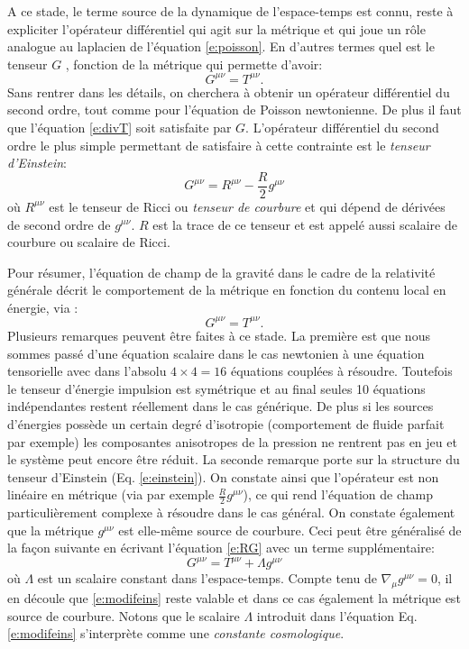 A ce stade, le terme source de la dynamique de l'espace-temps est connu, reste à expliciter l'opérateur différentiel qui agit sur la métrique et qui joue un rôle analogue au laplacien de l'équation \ref{e:poisson}. En d'autres termes quel est le tenseur $G$ , fonction de la métrique qui permette d'avoir:
\begin{equation}
G^{\mu\nu}=T^{\mu\nu}.
\end{equation}
Sans rentrer dans les détails, on cherchera à obtenir un opérateur différentiel du second ordre, tout comme pour l'équation de Poisson newtonienne. De plus il faut que l'équation \ref{e:divT} soit satisfaite par $G$. L'opérateur différentiel du second ordre le plus simple permettant de satisfaire à cette contrainte est le \textit{tenseur d'Einstein}:
\begin{equation}
G^{\mu\nu}=R^{\mu\nu}-\frac{R}{2}g^{\mu\nu}
\label{e:einstein}
\end{equation}
où $R^{\mu\nu}$ est le tenseur de Ricci ou \textit{tenseur de courbure} et qui dépend de dérivées de second ordre de $g^{\mu\nu}$. $R$ est la trace de ce tenseur et est appelé aussi scalaire de courbure ou scalaire de Ricci.

Pour résumer, l'équation de champ de la gravité dans le cadre de la relativité générale décrit le comportement de la métrique en fonction du contenu local en énergie, via :
\begin{equation}
G^{\mu\nu}=T^{\mu\nu}.
\label{e:RG}
\end{equation}
Plusieurs remarques peuvent être faites à ce stade. La première est que nous sommes passé d'une équation scalaire dans le cas newtonien à une équation tensorielle avec dans l'absolu $ 4\times 4=16$ équations couplées à résoudre. Toutefois le tenseur d'énergie impulsion est symétrique et au final seules 10 équations indépendantes restent réellement dans le cas générique. De plus si les sources d'énergies possède un certain degré d'isotropie (comportement de fluide parfait par exemple) les composantes anisotropes de la pression ne rentrent pas en jeu et le système peut encore être réduit. La seconde remarque porte sur la structure du tenseur d'Einstein (Eq. \ref{e:einstein}). On constate ainsi que l'opérateur est non linéaire  en métrique (via par exemple $\frac{R}{2}g^{\mu\nu}$), ce qui rend l'équation de champ particulièrement complexe à résoudre dans le cas général. On constate également que la métrique $g^{\mu\nu}$ est elle-même source de courbure. Ceci peut être généralisé de la façon suivante en écrivant l'équation \ref{e:RG} avec un terme supplémentaire:
\begin{equation}
G^{\mu\nu}=T^{\mu\nu}+\Lambda g^{\mu\nu}
\label{e:modifeins}
\end{equation}
où $\Lambda$ est un scalaire constant dans l'espace-temps. Compte tenu de $\nabla_\mu g^{\mu \nu}=0$, il en découle que \ref{e:modifeins} reste valable et dans ce cas également la métrique est source de courbure. Notons que le scalaire $\Lambda$ introduit dans l'équation Eq. \ref{e:modifeins} s'interprète comme une \textit{constante cosmologique}.


